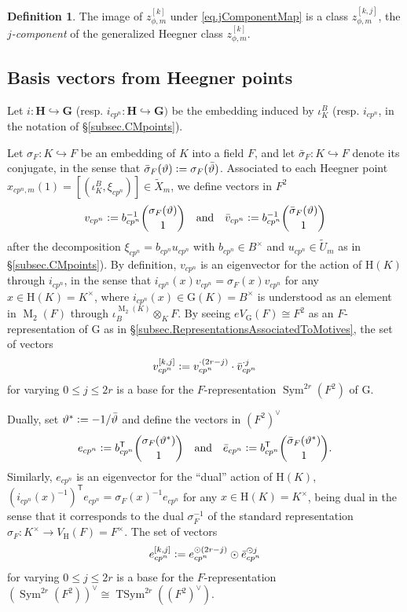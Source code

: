 \documentclass[a4paper]{amsart}
\numberwithin{equation}{section}
\theoremstyle{definition}
\newtheorem{definition}[theorem]{Definition}
\newcommand{\defeq}{\vcentcolon=}
\DeclareMathOperator{\M}{M}
\DeclareMathOperator{\TSym}{TSym}
\DeclareMathOperator{\Sym}{Sym}
\newcommand{\boldG}{\boldsymbol{\mathrm{G}}}
\newcommand{\boldH}{\boldsymbol{\mathrm{H}}}
\begin{document}
\begin{definition}
The image of $z_{\phi,m}^{[k]}$ under \eqref{eq.jComponentMap} is a class $z_{\phi,m}^{[k,j]}$, the \emph{$j$-component} of the generalized Heegner class $z_{\phi,m}^{[k]}$.
\end{definition}

\subsection{Basis vectors from Heegner points}\label{subsec.BasisVectors}
Let $i\colon\mathbf{H}\hookrightarrow\mathbf{G}$ (resp. $i_{cp^n}\colon \mathbf{H}\hookrightarrow\mathbf{G})$ be the embedding induced by $\iota_K^B$ (resp. $i_{cp^n}$, in the notation of \S\ref{subsec.CMpoints}).

Let $\sigma_F\colon K\hookrightarrow F$ be an embedding of $K$ into a field $F$, and let $\bar\sigma_F\colon K\hookrightarrow F$ denote its conjugate, in the sense that $\bar{\sigma}_F(\vartheta)\defeq\sigma_F(\bar{\vartheta})$. Associated to each Heegner point $x_{cp^n,m}(1)=[(\iota_K^B,\xi_{cp^n})]\in \widetilde{X}_m$, we define vectors in $F^2$ \[v_{cp^n}\defeq b_{cp^n}^{-1}\binom{\sigma_F(\vartheta)}{1}\hspace{10pt}\text{and}\hspace{10pt}\bar{v}_{cp^n}\defeq b_{cp^n}^{-1}\binom{\bar{\sigma}_F({\vartheta})}{1}\] after the decomposition $\xi_{cp^n}=b_{cp^n}u_{cp^n}$ with $b_{cp^n}\in B^\times$ and $u_{cp^n}\in \widetilde{U}_m$ as in \S\ref{subsec.CMpoints}). By definition, $v_{cp^n}$ is an eigenvector for the action of $\boldH(K)$ through $i_{cp^n}$, in the sense that $i_{cp^n}(x)v_{cp^n}=\sigma_F(x)v_{cp^n}$ for any $x\in\boldH(K)=K^\times$, where $i_{cp^n}(x)\in\boldG(K)=B^\times$ is understood as an element in $\M_2(F)$ through $\iota_B^{\M_2(K)}\otimes_K F$. By seeing $eV_{\boldG}(F)\cong F^2$ as an $F$-representation of $\boldG$ as in \S\ref{subsec.RepresentationsAssociatedToMotives}, the set of vectors \[v_{cp^n}^{[k,j]}\defeq v_{cp^n}^{\cdot(2r-j)}\cdot \bar{v}_{cp^n}^{\cdot j}\]for varying $0\le j\le 2r$ is a base for the $F$-representation $\Sym^{2r}(F^2)$ of $\boldG$.

Dually, set $\vartheta^\ast\defeq -1/\bar{\vartheta}$ and define the vectors in $(F^2)^\vee$ \[e_{cp^n}\defeq  b_{cp^n}^\mathsf{T}\binom{\sigma_F(\vartheta^{\ast})}{1}\hspace{10pt}\text{and}\hspace{10pt}\bar{e}_{cp^n}\defeq b_{cp^n}^\mathsf{T}\binom{\bar{\sigma}_F(\vartheta^\ast)}{1}.\] Similarly, $e_{cp^n}$ is an eigenvector for the ``dual'' action of $\boldH(K)$, $(i_{cp^n}(x)^{-1})^\mathsf{T}e_{cp^n}=\sigma_F(x)^{-1}e_{cp^n}$ for any $x\in\boldH(K)=K^\times$, being dual in the sense that it corresponds to the dual $\sigma_F^{-1}$ of the standard representation $\sigma_F\colon K^\times\to V_{\boldH}(F)=F^\times$. The set of vectors \[e_{cp^n}^{[k,j]}\defeq e_{cp^n}^{\odot(2r-j)}\odot \bar{e}_{cp^n}^{\odot j}\]for varying $0\le j\le 2r$ is a base for the $F$-representation $(\Sym^{2r}(F^2))^\vee\cong\TSym^{2r}\left((F^2)^\vee\right)$.
\end{document}
